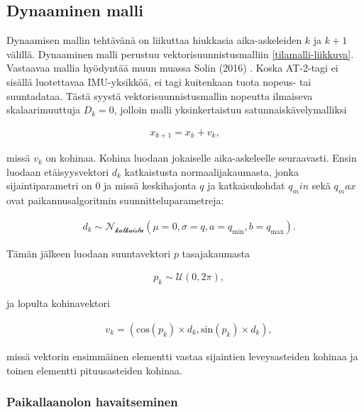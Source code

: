 \documentclass[
  12pt,
  a4paper, twoside]{book}
\begin{document}
\hypertarget{dynaaminen-malli}{%
\subsection{Dynaaminen malli}\label{dynaaminen-malli}}

Dynaamisen mallin tehtävänä on liikuttaa hiukkasia aika-askeleiden \(k\) ja \(k+1\) välillä. Dynaaminen malli perustuu vektorisuunnistusmalliin \ref{tilamalli-liikkuva}. Vastaavaa mallia hyödyntää muun muassa Solin (2016) \citep{Solin-2016}. Koska AT-2-tagi ei sisällä luotettavaa IMU-yksikköä, ei tagi kuitenkaan tuota nopeus- tai suuntadataa. Tästä syystä vektorisuunnistusmallin nopeutta ilmaiseva skalaarimuuttuja \(D_k=0\), jolloin malli yksinkertaistuu satunnaiskävelymalliksi

\begin{align}\label{dynaaminen-malli-empiirinen}
x_{k+1}=x_k + v_k,
\end{align}

missä \(v_k\) on kohinaa. Kohina luodaan jokaiselle aika-askeleelle seuraavasti. Ensin luodaan etäisyysvektori \(d_k\) katkaistusta normaalijakaumasta, jonka sijaintiparametri on 0 ja missä keskihajonta \(q\) ja katkaisukohdat \(q_min\) sekä \(q_max\) ovat paikannusalgoritmin suunnitteluparametreja:

\begin{align}
&d_k \sim \mathcal{N_{\text{katkaistu}}}(\mu=0, \sigma=q, a=q_{\text{min}}, b=q_{\text{max}}).
\end{align}

Tämän jälkeen luodaan suuntavektori \(p\) tasajakaumasta

\begin{align}
&p_k\sim\mathcal{U}(0, 2 \pi),
\end{align}

ja lopulta kohinavektori

\begin{align}
&v_k = (\text{cos}(p_k) \times d_k, \text{sin}(p_k) \times d_k),
\end{align}

missä vektorin ensimmäinen elementti vastaa sijaintien leveysasteiden kohinaa ja toinen elementti pituusasteiden kohinaa.

\hypertarget{paikallaanolon-havaitseminen}{%
\subsubsection{Paikallaanolon havaitseminen}\label{paikallaanolon-havaitseminen}}
\end{document}

